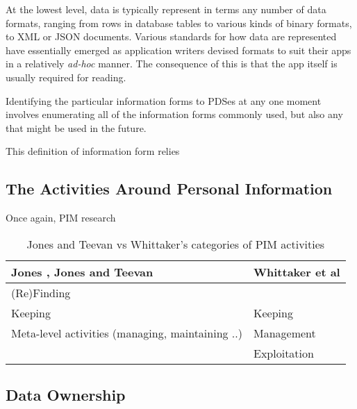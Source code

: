 \documentclass[runningheads,a4paper]{llncs}
\begin{document}
At the lowest level, data is typically represent in terms any number of data formats, ranging from rows in database tables to various kinds of binary formats, to XML or JSON documents.  Various standards for how data are represented have essentially emerged as application writers devised formats to suit their apps in a relatively \emph{ad-hoc} manner.  The consequence of this is that the app itself is usually required for reading.

Identifying the particular information forms to PDSes at any one moment involves enumerating all of the information forms commonly used, but also any that might be used in the future. 

This definition of information form relies 

\subsection{The Activities Around Personal Information}

Once again, PIM research 

\begin{table}
\begin{tabular}{p{5cm} p{7cm}} 
Jones \cite{jones}, Jones and Teevan \cite{jonesteevan}& Whittaker et al \cite{whittaker}\\
\hline
(Re)Finding &  \\
Keeping & Keeping \\
Meta-level activities (managing, maintaining ..) & Management \\
 & Exploitation \\
\end{tabular}
\caption{Jones and Teevan vs Whittaker's categories of PIM activities}
\label{fig:pimactivities}
\end{table}

\subsection{Data Ownership}



\end{document}
